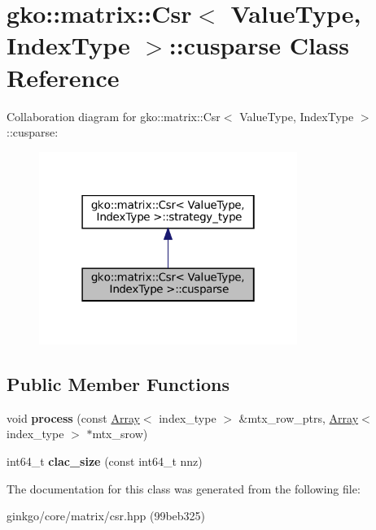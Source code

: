 \hypertarget{classgko_1_1matrix_1_1Csr_1_1cusparse}{}\section{gko\+:\+:matrix\+:\+:Csr$<$ Value\+Type, Index\+Type $>$\+:\+:cusparse Class Reference}
\label{classgko_1_1matrix_1_1Csr_1_1cusparse}


Collaboration diagram for gko\+:\+:matrix\+:\+:Csr$<$ Value\+Type, Index\+Type $>$\+:\+:cusparse\+:
\nopagebreak
\begin{figure}[H]
\begin{center}
\leavevmode
\includegraphics[width=238pt]{classgko_1_1matrix_1_1Csr_1_1cusparse__coll__graph}
\end{center}
\end{figure}
\subsection*{Public Member Functions}
\begin{DoxyCompactItemize}
\item 
\mbox{\label{classgko_1_1matrix_1_1Csr_1_1cusparse_ad913d7450cec714fda555ac1a0c781bc}} 
void {\bfseries process} (const \hyperlink{classgko_1_1Array}{Array}$<$ index\+\_\+type $>$ \&mtx\+\_\+row\+\_\+ptrs, \hyperlink{classgko_1_1Array}{Array}$<$ index\+\_\+type $>$ $\ast$mtx\+\_\+srow)
\item 
\mbox{\label{classgko_1_1matrix_1_1Csr_1_1cusparse_a3a11fb0655b828fb590a87f5f83e9373}} 
int64\+\_\+t {\bfseries clac\+\_\+size} (const int64\+\_\+t nnz)
\end{DoxyCompactItemize}


The documentation for this class was generated from the following file\+:\begin{DoxyCompactItemize}
\item 
ginkgo/core/matrix/csr.\+hpp (99beb325)\end{DoxyCompactItemize}
